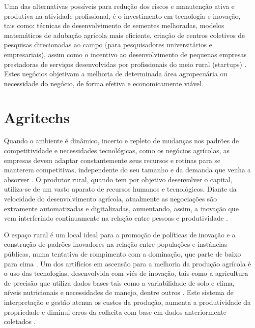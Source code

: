 Uma das alternativas possíveis para redução dos riscos e manutenção ativa e produtiva na atividade profissional, é o investimento em tecnologia e inovação, tais como: técnicas de desenvolvimento de sementes melhoradas, modelos matemáticos de adubação agrícola mais eficiente, criação de centros coletivos de pesquisas direcionadas ao campo (para pesquisadores universitários e empresariais), assim como o incentivo ao desenvolvimento de pequenas empresas prestadoras de serviços desenvolvidas por profissionais do meio rural (startups) \cite{bochi_dorneles_coletivos_2014, gomes_inovacao_2014}.
Estes negócios objetivam a melhoria de determinada área agropecuária \cite{volpato_agtechs_2019} ou necessidade do negócio, de forma efetiva e economicamente viável. 

\section{Agritechs}

Quando o ambiente é dinâmico, incerto e repleto de mudanças nos padrões de competitividade e necessidades tecnológicas, como os negócios agrícolas, as empresas devem adaptar constantemente seus recursos e rotinas para se manterem competitivas, independente do seu tamanho e da demanda que venha a absorver \cite{fitz-koch_reciprocal_2017}. O produtor rural, quando tem por objetivo desenvolver o capital, utiliza-se de um vasto aparato de recursos humanos e tecnológicos. Diante da velocidade do desenvolvimento agrícola, atualmente as negociações são extramente automatizadas e digitalizadas, aumentando, assim, a inovação que vem interferindo continuamente na relação entre pessoas e produtividade \cite{campos_o_2016}. 

O espaço rural é um local ideal para a promoção de políticas de inovação e a construção de padrões inovadores na relação entre populações e instâncias públicas, numa tentativa de rompimento com a dominação, que parte de baixo para cima \cite{magruder_assessment_2018}. Um dos artifícios em ascensão para a melhoria da produção agrícola é o uso das tecnologias, desenvolvida com viés de inovação, tais como a agricultura de precisão que utiliza dados bases tais como a variabilidade de solo e clima, níveis nutricionais e necessidades de manejo, dentre outros \cite{barnes_exploring_2019}. Este sistema de interpretação e gestão atenua os custos da produção, aumenta a produtividade da propriedade e diminui erros da colheita com base em dados anteriormente coletados \cite{barnes_influencing_2018}.


